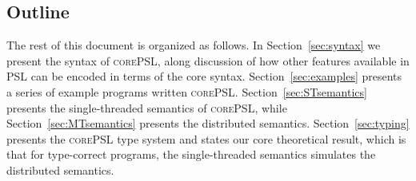 \documentclass[10pt]{article}
\newcommand{\lang}{\textsc{corePSL}\xspace}
\begin{document}
\subsection{Outline}

The rest of this document is organized as follows. In
Section~\ref{sec:syntax} we present the syntax of \lang, along
discussion of how other features available in PSL can be encoded in
terms of the core syntax. Section~\ref{sec:examples} presents a series
of example programs written \lang. Section~\ref{sec:STsemantics}
presents the single-threaded semantics of \lang, while
Section~\ref{sec:MTsemantics} presents the distributed
semantics. Section~\ref{sec:typing} presents the \lang type system and
states our core theoretical result, which is that for type-correct
programs, the single-threaded semantics simulates the distributed
semantics.
\end{document}
